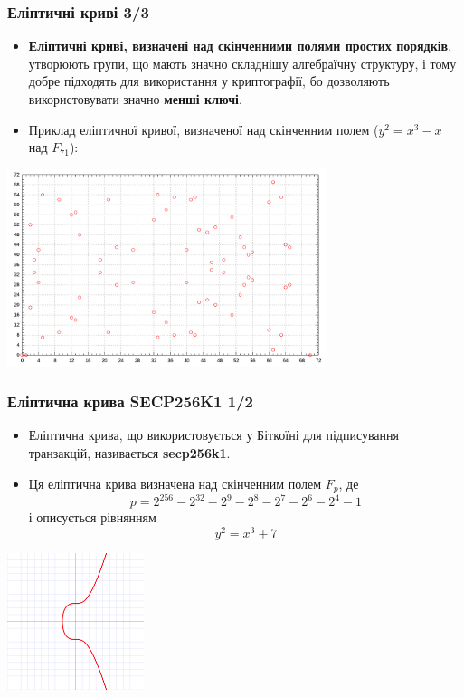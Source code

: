 \documentclass{beamer}
\begin{document}
\begin{frame}
  \frametitle{Еліптичні криві 3/3}
  \begin{itemize}
  \item \textbf{Еліптичні криві, визначені над скінченними полями простих
      порядків}, утворюють групи, що мають значно складнішу алгебраїчну
    структуру, і тому добре підходять для використання у криптографії, бо
    дозволяють використовувати значно \textbf{менші ключі}.
  \item Приклад еліптичної кривої, визначеної над скінченним полем ($y^2 = x
    ^3 - x$ над $F_{71}$):
  \end{itemize}
  \begin{center}
    \includegraphics[width=0.7\textwidth]{ec_finite_field_group}
  \end{center}
\end{frame}

\begin{frame}
  \frametitle{Еліптична крива SECP256K1 1/2}
  \begin{itemize}
  \item Еліптична крива, що використовується у Біткоїні для підписування
    транзакцій, називається \textbf{secp256k1}.
  \item Ця еліптична крива визначена над скінченним полем $F_p$, де
    $$p = 2^{256} - 2^{32} - 2^9 - 2^8 - 2^7 - 2^6 - 2^4 - 1$$ і описується рівнянням
    $$y^2 = x^3 + 7$$
  \end{itemize}
  \begin{center}
    \includegraphics[width=0.3\textwidth]{secp256k1}
  \end{center}
\end{frame}
\end{document}
